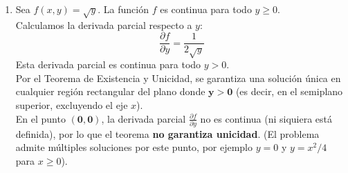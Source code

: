 \documentclass[12pt]{article}
\begin{document}
\begin{enumerate}[label=\textbf{\arabic*.}]
    \item Sea $f(x,y) = \sqrt{y}$. La función $f$ es continua para todo $y \ge 0$. \\
    Calculamos la derivada parcial respecto a $y$:
    \[ \frac{\partial f}{\partial y} = \frac{1}{2\sqrt{y}} \]
    Esta derivada parcial es continua para todo $y > 0$. \\
    Por el Teorema de Existencia y Unicidad, se garantiza una solución única en cualquier región rectangular del plano donde $\mathbf{y > 0}$ (es decir, en el semiplano superior, excluyendo el eje $x$). \\
    En el punto $\mathbf{(0,0)}$, la derivada parcial $\frac{\partial f}{\partial y}$ no es continua (ni siquiera está definida), por lo que el teorema \textbf{no garantiza unicidad}. (El problema admite múltiples soluciones por este punto, por ejemplo $y=0$ y $y=x^2/4$ para $x \ge 0$).
\end{enumerate}
\end{document}

